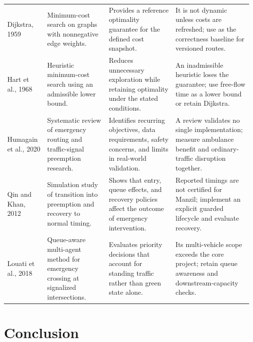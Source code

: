 \begin{longtable}{P{0.18\textwidth}P{0.23\textwidth}P{0.24\textwidth}P{0.20\textwidth}}
Dijkstra, 1959 \cite{dijkstra1959} & Minimum-cost search on graphs with nonnegative edge weights. & Provides a reference optimality guarantee for the defined cost snapshot. & It is not dynamic unless costs are refreshed; use as the correctness baseline for versioned routes.\\
Hart et al., 1968 \cite{hart1968astar} & Heuristic minimum-cost search using an admissible lower bound. & Reduces unnecessary exploration while retaining optimality under the stated conditions. & An inadmissible heuristic loses the guarantee; use free-flow time as a lower bound or retain Dijkstra.\\
Humagain et al., 2020 \cite{humagain2020review} & Systematic review of emergency routing and traffic-signal preemption research. & Identifies recurring objectives, data requirements, safety concerns, and limits in real-world validation. & A review validates no single implementation; measure ambulance benefit and ordinary-traffic disruption together.\\
Qin and Khan, 2012 \cite{qin2012preemption} & Simulation study of transition into preemption and recovery to normal timing. & Shows that entry, queue effects, and recovery policies affect the outcome of emergency intervention. & Reported timings are not certified for Manzil; implement an explicit guarded lifecycle and evaluate recovery.\\
Louati et al., 2018 \cite{el2018emergency} & Queue-aware multi-agent method for emergency crossing at signalized intersections. & Evaluates priority decisions that account for standing traffic rather than green state alone. & Its multi-vehicle scope exceeds the core project; retain queue awareness and downstream-capacity checks.\\
\bottomrule
\end{longtable}

\section{Conclusion}

